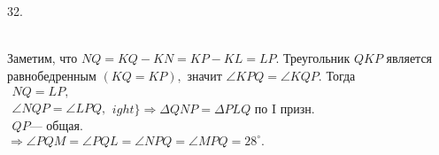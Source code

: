 32. \begin{figure}[ht!]
\end{figure}\\
Заметим, что $NQ=KQ-KN=KP-KL=LP.$ Треугольник $QKP$ является равнобедренным $(KQ=KP),$ значит $\angle KPQ=\angle KQP.$ Тогда
$\left.\begin{array}{l}NQ=LP,\\
\angle NQP=\angle LPQ,\\
QP\text{--- общая.}  \end{array}
ight\}\Rightarrow \Delta QNP=\Delta PLQ\text{ по I призн.}$\\$\Rightarrow \angle PQM=\angle PQL=\angle NPQ=\angle MPQ=28^\circ.$\\

